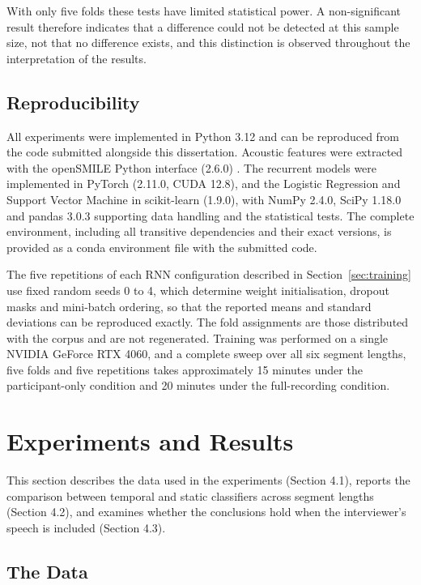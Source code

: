 \documentclass{mproj}
\begin{document}
With only five folds these tests have limited statistical power. A non-significant result therefore indicates that a difference could not be detected at this sample size, not that no difference exists, and this distinction is observed throughout the interpretation of the results.

\section{Reproducibility}\label{sec:reproducibility}

All experiments were implemented in Python 3.12 and can be reproduced from the code submitted alongside this dissertation. Acoustic features were extracted with the openSMILE Python interface (2.6.0) \cite{eyben2013}. The recurrent models were implemented in PyTorch (2.11.0, CUDA 12.8), and the Logistic Regression and Support Vector Machine in scikit-learn (1.9.0), with NumPy 2.4.0, SciPy 1.18.0 and pandas 3.0.3 supporting data handling and the statistical tests. The complete environment, including all transitive dependencies and their exact versions, is provided as a conda environment file with the submitted code.

The five repetitions of each RNN configuration described in Section~\ref{sec:training} use fixed random seeds 0 to 4, which determine weight initialisation, dropout masks and mini-batch ordering, so that the reported means and standard deviations can be reproduced exactly. The fold assignments are those distributed with the corpus and are not regenerated. Training was performed on a single NVIDIA GeForce RTX 4060, and a complete sweep over all six segment lengths, five folds and five repetitions takes approximately 15 minutes under the participant-only condition and 20 minutes under the full-recording condition.

\chapter{Experiments and Results}\label{results}

This section describes the data used in the experiments (Section 4.1), reports the comparison between temporal and static classifiers across segment lengths (Section 4.2), and examines whether the conclusions hold when the interviewer's speech is included (Section 4.3).

\section{The Data}\label{sec:data}
\end{document}
